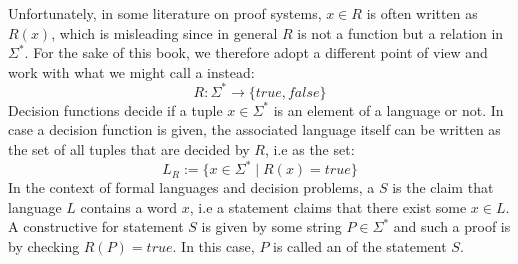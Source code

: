 Unfortunately, in some literature on proof systems, $x\in R$ is often written as $R(x)$, which is  misleading since in general $R$ is not a function but a relation in $\Sigma^*$. For the sake of this book, we therefore adopt a different point of view and work with what we might call a  instead:
\begin{equation}\label{eq:decision-function}
R: \Sigma^* \to \{true, false\}
\end{equation}
Decision functions decide if a tuple $x\in \Sigma^*$ is an element of a language or not. In case a decision function is given, the associated language itself can be written as the set of all tuples that are decided by $R$, i.e as the set:
\begin{equation}
L_R := \{x\in \Sigma^*\;|\; R(x)=true\}
\end{equation}
In the context of formal languages and decision problems, a  $S$ is the claim that language $L$ contains a word $x$, i.e a statement claims that there exist some $x\in L$. A constructive  for statement $S$ is given by some string $P\in \Sigma^*$ and such a proof is  by checking $R(P)=true$. In this case, $P$ is called an  of the statement $S$.

